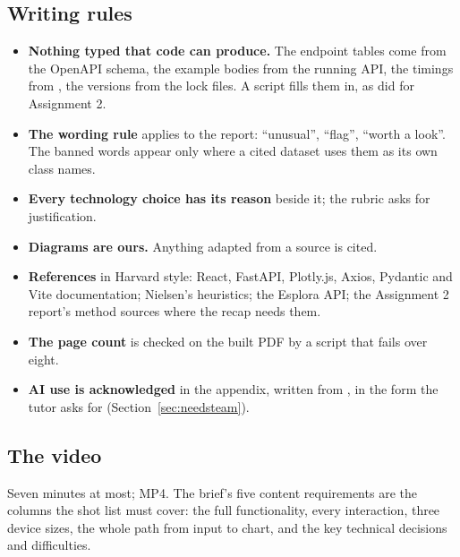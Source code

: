 \subsection{Writing rules}

\begin{itemize}
  \item \textbf{Nothing typed that code can produce.} The endpoint tables come from the OpenAPI
    schema, the example bodies from the running API, the timings from , the
    versions from the lock files. A script fills them in, as  did for
    Assignment 2.
  \item \textbf{The wording rule} applies to the report: ``unusual'', ``flag'', ``worth a look''.
    The banned words appear only where a cited dataset uses them as its own class names.
  \item \textbf{Every technology choice has its reason} beside it; the rubric asks for
    justification.
  \item \textbf{Diagrams are ours.} Anything adapted from a source is cited.
  \item \textbf{References} in Harvard style: React, FastAPI, Plotly.js, Axios, Pydantic and Vite
    documentation; Nielsen's heuristics; the Esplora API; the Assignment 2 report's method sources
    where the recap needs them.
  \item \textbf{The page count} is checked on the built PDF by a script that fails over eight.
  \item \textbf{AI use is acknowledged} in the appendix, written from ,
    in the form the tutor asks for (Section~\ref{sec:needsteam}).
\end{itemize}

\subsection{The video}
\label{sec:video}

Seven minutes at most; MP4. The brief's five content requirements are the columns the shot list
must cover: the full functionality, every interaction, three device sizes, the whole path from
input to chart, and the key technical decisions and difficulties.

